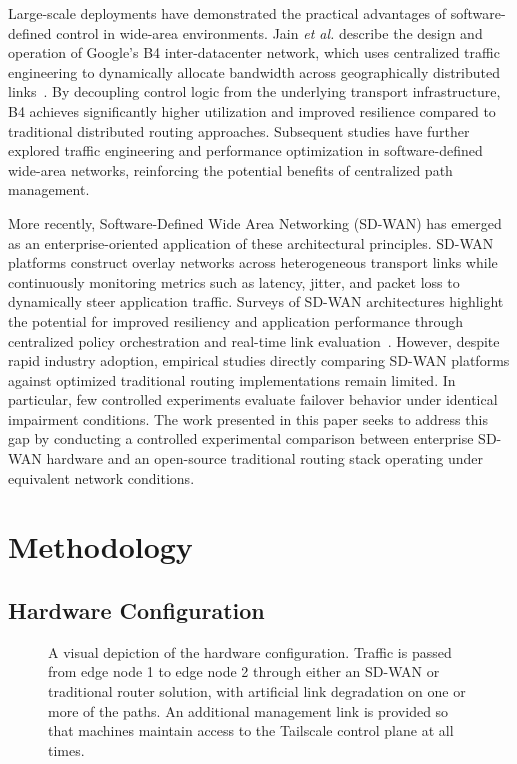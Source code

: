 \documentclass[conference]{IEEEtran}
\begin{document}
Large-scale deployments have demonstrated the practical advantages of software-defined control in wide-area environments. Jain \textit{et al.} describe the design and operation of Google's B4 inter-datacenter network, which uses centralized traffic engineering to dynamically allocate bandwidth across geographically distributed links~\cite{jain2013}. By decoupling control logic from the underlying transport infrastructure, B4 achieves significantly higher utilization and improved resilience compared to traditional distributed routing approaches. Subsequent studies have further explored traffic engineering and performance optimization in software-defined wide-area networks, reinforcing the potential benefits of centralized path management.

More recently, Software-Defined Wide Area Networking (SD-WAN) has emerged as an enterprise-oriented application of these architectural principles. SD-WAN platforms construct overlay networks across heterogeneous transport links while continuously monitoring metrics such as latency, jitter, and packet loss to dynamically steer application traffic. Surveys of SD-WAN architectures highlight the potential for improved resiliency and application performance through centralized policy orchestration and real-time link evaluation~\cite{sun2018}. However, despite rapid industry adoption, empirical studies directly comparing SD-WAN platforms against optimized traditional routing implementations remain limited. In particular, few controlled experiments evaluate failover behavior under identical impairment conditions. The work presented in this paper seeks to address this gap by conducting a controlled experimental comparison between enterprise SD-WAN hardware and an open-source traditional routing stack operating under equivalent network conditions.

\section{Methodology}

\subsection{Hardware Configuration}

\begin{figure}[tbp]
\centering

\caption{A visual depiction of the hardware configuration. Traffic is passed from edge node 1 to edge node 2 through either an SD-WAN or traditional router solution, with artificial link degradation on one or more of the paths. An additional management link is provided so that machines maintain access to the Tailscale control plane at all times.}
\label{hwconfig}
\end{figure}
\end{document}
